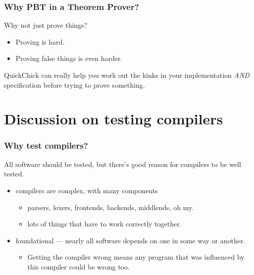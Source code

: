 \documentclass{beamer}
\begin{document}
\begin{frame}
  \frametitle{Why PBT in a Theorem Prover?}

  Why not just prove things?

  \begin{itemize}
  \item Proving is hard.
    \pause
  \item Proving false things is even harder.
  \end{itemize}

  QuickChick can really help you work out the kinks in your
  implementation \emph{AND} specification before trying to prove something.
\end{frame}

\section{Discussion on testing compilers}

\begin{frame}
  \frametitle{Why test compilers?}

  All software should be tested, but there's good reason for compilers
  to be well tested.

  \begin{itemize}
  \item compilers are complex, with many components
          \begin{itemize}
          \item parsers, lexers, frontends, backends, middlends, oh my.
          \item lots of things that have to work correctly together.
          \end{itemize}
  \item foundational --- nearly all software depends on one in some
    way or another.
    \begin{itemize}
    \item Getting the compiler wrong means any program that was
      influenced by this compiler could be wrong too.
    \end{itemize}
  \end{itemize}
\end{frame}


  
\end{document}
